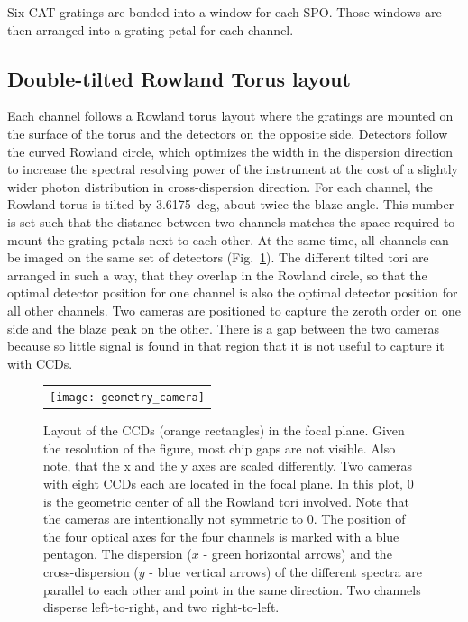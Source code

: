 \documentclass[12pt]{spieman}  %
\begin{document}
\begin{spacing}{2}
Six CAT gratings are bonded into a window for each SPO. Those windows are then arranged into a grating petal for each channel.

\subsection{Double-tilted Rowland Torus layout}
Each channel follows a Rowland torus layout\cite{Beuermann:78} where the gratings are mounted on the surface of the torus and the detectors on the opposite side. Detectors follow the curved Rowland circle, which optimizes the width in the dispersion direction to increase the spectral resolving power of the instrument at the cost of a slightly wider photon distribution in cross-dispersion direction. For each channel, the Rowland torus is tilted by 3.6175~deg, about twice the blaze angle\cite{10.1117/12.856482,10.1117/12.2273011,DTRS}. This number is set such that the distance between two channels matches the space required to mount the grating petals next to each other. At the same time, all channels can be imaged on the same set of detectors (Fig.~\ref{fig:geometry_camera}).
The different tilted tori are arranged in such a way, that they overlap in the Rowland circle, so that the optimal detector position for one channel is also the optimal detector position for all other channels.
Two cameras are positioned to capture the zeroth order on one side and the blaze peak on the other. There is a gap between the two cameras because so little signal is found in that region that it is not useful to capture it with CCDs.

\begin{figure} [ht]
    \begin{center}
    \begin{tabular}{c} %
    \texttt{[image: geometry\_camera]}
    \end{tabular}
    \end{center}
    \caption {\label{fig:geometry_camera}
    Layout of the CCDs (orange rectangles) in the focal plane. Given the resolution of the figure, most chip gaps are not visible. Also note, that the x and the y axes are scaled differently. Two cameras with eight CCDs each are located in the focal plane. In this plot, 0 is the geometric center of all the Rowland tori involved. Note that the cameras are intentionally not symmetric to 0.
    The position of the four optical axes for the four channels is marked with a blue pentagon.  The dispersion ($x$ - green horizontal arrows) and the cross-dispersion ($y$ - blue vertical arrows) of the different spectra are parallel to each other and point in the same direction. Two channels disperse left-to-right, and two right-to-left.
    }
\end{figure}


\end{spacing}
\end{document}
